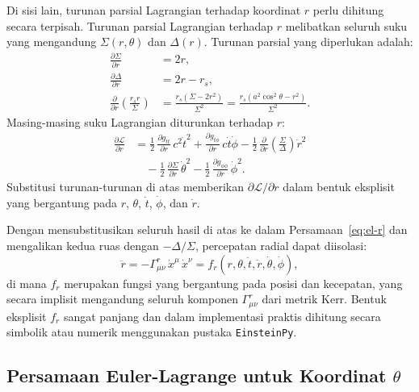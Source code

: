 Di sisi lain, turunan parsial Lagrangian terhadap koordinat $r$ perlu dihitung secara terpisah.
Turunan parsial Lagrangian terhadap $r$ melibatkan seluruh suku
yang mengandung $\Sigma(r,\theta)$ dan $\Delta(r)$.
Turunan parsial yang diperlukan adalah:
\begin{align}
    \frac{\partial\Sigma}{\partial r} &= 2r, \label{eq:dsigma-dr} \\[4pt]
    \frac{\partial\Delta}{\partial r} &= 2r - r_s, \label{eq:ddelta-dr} \\[4pt]
    \frac{\partial}{\partial r}\!\left(\frac{r_s r}{\Sigma}\right)
    &= \frac{r_s(\Sigma - 2r^2)}{\Sigma^2}
     = \frac{r_s(a^2\cos^2\!\theta - r^2)}{\Sigma^2}. \label{eq:drsr-sigma}
\end{align}
Masing-masing suku Lagrangian diturunkan terhadap $r$:
\begin{equation}
\begin{aligned}
    \frac{\partial\mathcal{L}}{\partial r}
    &= \frac{1}{2}\,\frac{\partial g_{tt}}{\partial r}\,c^2\dot{t}^2
     + \frac{\partial g_{t\phi}}{\partial r}\,c\dot{t}\dot{\phi}
     - \frac{1}{2}\,\frac{\partial}{\partial r}\!\left(\frac{\Sigma}{\Delta}\right)\dot{r}^2 \\
    &\quad - \frac{1}{2}\,\frac{\partial\Sigma}{\partial r}\,\dot{\theta}^2
     - \frac{1}{2}\,\frac{\partial g_{\phi\phi}}{\partial r}\,\dot{\phi}^2.
\end{aligned}
    \label{eq:dL-dr}
\end{equation}
Substitusi turunan-turunan di atas memberikan $\partial\mathcal{L}/\partial r$
dalam bentuk eksplisit yang bergantung pada $r$, $\theta$, $\dot{t}$, $\dot{\phi}$, dan $\dot{r}$.

Dengan mensubstitusikan seluruh hasil di atas ke dalam Persamaan~\eqref{eq:el-r}
dan mengalikan kedua ruas dengan $-\Delta/\Sigma$, percepatan radial dapat diisolasi:
\begin{equation}
    \boxed{\ddot{r} = -\Gamma^r_{\mu\nu}\,\dot{x}^\mu\,\dot{x}^\nu
    = f_r(r, \theta, \dot{t}, \dot{r}, \dot{\theta}, \dot{\phi}),}
    \label{eq:geodesic-r}
\end{equation}
di mana $f_r$ merupakan fungsi yang bergantung pada posisi dan kecepatan,
yang secara implisit mengandung seluruh komponen
$\Gamma^r_{\mu\nu}$ dari metrik Kerr.
Bentuk eksplisit $f_r$ sangat panjang dan dalam implementasi praktis
dihitung secara simbolik atau numerik menggunakan pustaka \texttt{EinsteinPy}.


\subsection{Persamaan Euler-Lagrange untuk Koordinat $\theta$}
\label{subsec:euler-lagrange-theta}

